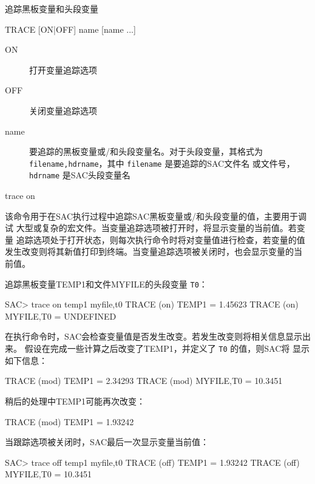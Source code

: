 \label{cmd:trace}

追踪黑板变量和头段变量

\begin{SACSTX}
TRACE [ON|OFF] name [name ...]
\end{SACSTX}

\begin{description}
\item [ON] 打开变量追踪选项
\item [OFF] 关闭变量追踪选项
\item [name] 要追踪的黑板变量或/和头段变量名。对于头段变量，其格式为
    \texttt{filename,hdrname}，其中 \texttt{filename} 是要追踪的SAC文件名
    或文件号，\texttt{hdrname} 是SAC头段变量名
\end{description}

\begin{SACDFT}
trace on
\end{SACDFT}

该命令用于在SAC执行过程中追踪SAC黑板变量或/和头段变量的值，主要用于调试
大型或复杂的宏文件。当变量追踪选项被打开时，将显示变量的当前值。若变量
追踪选项处于打开状态，则每次执行命令时将对变量值进行检查，若变量的值
发生改变则将其新值打印到终端。当变量追踪选项被关闭时，也会显示变量的当
前值。

追踪黑板变量TEMP1和文件MYFILE的头段变量 \texttt{T0}：
\begin{SACCode}
SAC> trace on temp1 myfile,t0
  TRACE  (on) TEMP1 = 1.45623
  TRACE  (on) MYFILE,T0 = UNDEFINED
\end{SACCode}

在执行命令时，SAC会检查变量值是否发生改变。若发生改变则将相关信息显示出来。
假设在完成一些计算之后改变了TEMP1，并定义了 \texttt{T0} 的值，则SAC将
显示如下信息：
\begin{SACCode}
  TRACE (mod) TEMP1 = 2.34293
  TRACE (mod) MYFILE,T0 = 10.3451
\end{SACCode}

稍后的处理中TEMP1可能再次改变：
\begin{SACCode}
  TRACE (mod) TEMP1 = 1.93242
\end{SACCode}

当跟踪选项被关闭时，SAC最后一次显示变量当前值：
\begin{SACCode}
SAC> trace off temp1 myfile,t0
  TRACE (off) TEMP1 = 1.93242
  TRACE (off) MYFILE,T0 = 10.3451
\end{SACCode}
